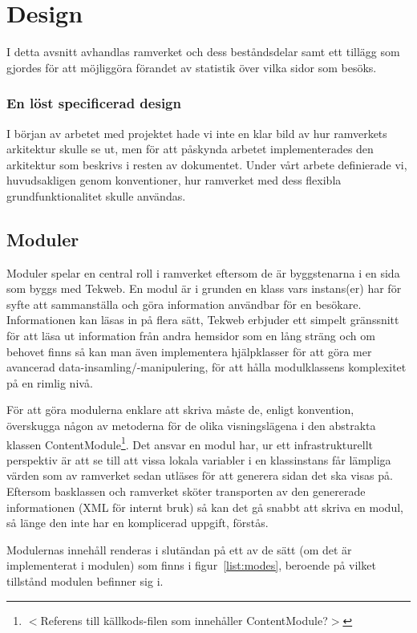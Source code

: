 \section{Design}
I detta avsnitt avhandlas ramverket och dess beståndsdelar samt ett tillägg som
gjordes för att möjliggöra förandet av statistik över vilka sidor som besöks.

\subsubsection*{En löst specificerad design}
I början av arbetet med projektet hade vi inte en klar bild av hur ramverkets
arkitektur skulle se ut, men för att påskynda arbetet implementerades den
arkitektur som beskrivs i resten av dokumentet. Under vårt arbete definierade
vi, huvudsakligen genom konventioner, hur ramverket med dess flexibla
grundfunktionalitet skulle användas.

\subsection{Moduler}
Moduler spelar en central roll i ramverket eftersom de är byggstenarna i en sida
som byggs med Tekweb. En modul är i grunden en klass vars instans(er) har
för syfte att sammanställa och göra information användbar för en besökare.
Informationen kan läsas in på flera sätt, Tekweb erbjuder ett simpelt gränssnitt
för att läsa ut information från andra hemsidor som en lång sträng och om
behovet finns så kan man även implementera hjälpklasser för att göra mer
avancerad data-insamling/-manipulering, för att hålla modulklassens komplexitet
på en rimlig nivå.

För att göra modulerna enklare att skriva måste de, enligt konvention,
överskugga någon av metoderna för de olika visningslägena i den abstrakta
klassen ContentModule\footnote{$<$Referens till källkods-filen som innehåller
ContentModule?$>$}. Det ansvar en modul har, ur ett infrastrukturellt perspektiv
är att se till att vissa lokala variabler i en klassinstans får lämpliga värden
som av ramverket sedan utläses för att generera sidan det ska visas på. Eftersom
basklassen och ramverket sköter transporten av den genererade informationen (XML
för internt bruk) så kan det gå snabbt att skriva en modul, så länge den inte
har en komplicerad uppgift, förstås.

Modulernas innehåll renderas i slutändan på ett av de sätt (om det är
implementerat i modulen) som finns i figur~\ref{list:modes}, beroende på vilket
tillstånd modulen befinner sig i.

